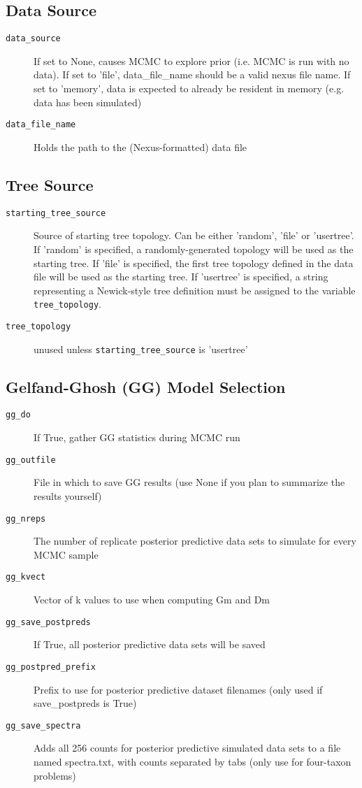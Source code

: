 \documentclass[10pt]{article}
\begin{document}
\subsection{Data Source}
\begin{description}
\item[{\tt data\_source}] If set to None, causes MCMC to explore prior (i.e. MCMC is run with no data). If set to 'file', data\_file\_name should be a valid nexus file name. If set to 'memory', data is expected to already be resident in memory (e.g. data has been simulated)
\item[{\tt data\_file\_name}] Holds the path to the (Nexus-formatted) data file
\end{description}

\subsection{Tree Source}
\begin{description}
\item[{\tt starting\_tree\_source}] Source of starting tree topology. Can be either 'random', 'file' or 'usertree'. If 'random' is specified, a randomly-generated topology will be used as the starting tree. If 'file' is specified, the first tree topology defined in the data file will be used as the starting tree. If 'usertree' is specified, a string representing a Newick-style tree definition must be assigned to the variable \verb+tree_topology+.
\item[{\tt tree\_topology}] unused unless \verb+starting_tree_source+ is 'usertree'
\end{description}

\subsection{Gelfand-Ghosh (GG) Model Selection}
\begin{description}
\item[{\tt gg\_do}] If True, gather GG statistics during MCMC run
\item[{\tt gg\_outfile}] File in which to save GG results (use None if you plan to summarize the results yourself)
\item[{\tt gg\_nreps}] The number of replicate posterior predictive data sets to simulate for every MCMC sample
\item[{\tt gg\_kvect}] Vector of k values to use when computing Gm and Dm
\item[{\tt gg\_save\_postpreds}] If True, all posterior predictive data sets will be saved
\item[{\tt gg\_postpred\_prefix}] Prefix to use for posterior predictive dataset filenames (only used if save\_postpreds is True)
\item[{\tt gg\_save\_spectra}] Adds all 256 counts for posterior predictive simulated data sets to a file named spectra.txt, with counts separated by tabs (only use for four-taxon problems)
\end{description}
\end{document}
